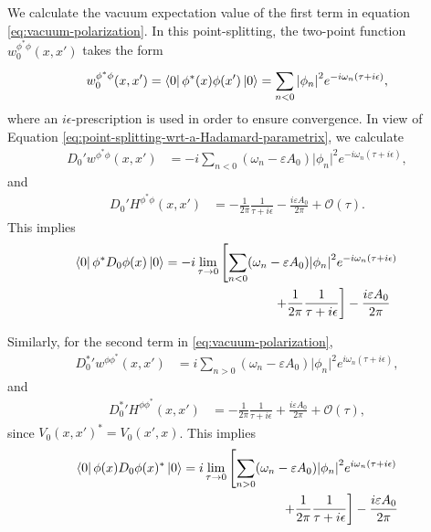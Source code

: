We calculate the vacuum expectation value of the first term in equation \eqref{eq:vacuum-polarization}.  In this point-splitting, the two-point function  $w_0^{\phi^*\phi }(x, x')$ takes the form
	\begin{align}
		w_0^{\phi^* \phi}(x, x') = \bra{0}\phi^*(x) \phi(x')\ket{0} = \sum_{n<0}^{} \abs{\phi_n}^2 e^{-i \omega_n \left( \tau + i\epsilon \right) },
	\end{align}
where an $i \epsilon$-prescription is used in order to ensure convergence. In view of Equation \eqref{eq:point-splitting-wrt-a-Hadamard-parametrix}, we calculate 
\begin{align}
	D_0'w^{\phi^* \phi}(x, x') &= -i \sum_{n<0} (\omega_n - \varepsilon A_0)\lvert \phi_n \rvert ^2 e^{-i\omega_n (\tau+i\epsilon)},
\end{align}
and 
\begin{align}
	D_0' H^{\phi^*\phi}(x, x') &= -\frac{1}{2\pi}\frac{1}{\tau + i\epsilon} - \frac{i\varepsilon A_0 }{2\pi} + \mathcal{O}(\tau).
\end{align}
This implies 
\begin{align}
\begin{split}
\bra{0}  \phi^* D_0\phi(x)\ket{0}  = -i\lim_{\tau \to 0} 
 &\left[\sum_{n<0}^{} (\omega_n - \varepsilon A_0)\abs{\phi_n}^2 e^{-i \omega_n \left( \tau + i\epsilon \right) } \right.\\
& \hspace{1.5cm}\left.+\frac{1}{2\pi}\frac{1}{\tau + i\epsilon} \right]- \frac{i\varepsilon A_0 }{2\pi} 
\end{split}\end{align}

Similarly, for the second term in \eqref{eq:vacuum-polarization}, 
\begin{align}
	D_0^*'w^{\phi\phi^* }(x, x') &= i \sum_{n>0} (\omega_n - \varepsilon A_0)\lvert \phi_n \rvert ^2 e^{i\omega_n (\tau+i\epsilon)},
\end{align}
and
\begin{align}
	D_0^*' H^{\phi\phi^*}(x, x') &= -\frac{1}{2\pi}\frac{1}{\tau + i\epsilon} + \frac{i\varepsilon A_0 }{2\pi} + \mathcal{O}(\tau),
\end{align}
since $V_0(x, x')^* = V_0(x', x)$.
This implies 
\begin{align}
\begin{split}
\bra{0}  \phi(x)D_0\phi(x)^* \ket{0}  = i\lim_{\tau \to 0} 
 \left[\sum_{n>0}^{} (\omega_n - \varepsilon A_0)\abs{\phi_n}^2 e^{i \omega_n \left( \tau + i\epsilon \right) }\right.
\\\left.+\frac{1}{2\pi}\frac{1}{\tau + i\epsilon} \right]- \frac{i\varepsilon A_0 }{2\pi} 
\end{split}\end{align}

